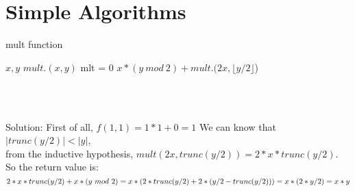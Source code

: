\documentclass{article}
\begin{document}
\section{Simple Algorithms}
\begin{algorithm}
    \caption{mult function}
    \begin{algorithmic}[1]
    \Require $x,y$
    \Ensure $mult.(x,y)$
    \State mlt = 0
    \Else 
    \State \Return $x*(y\ mod\ 2) + mult.(2x, \lfloor y/2 \rfloor$)
    \EndIf 
    \EndFunction
    \end{algorithmic}
\end{algorithm}
\\
\\Solution:
First of all, $f(1,1)=1*1+0=1$
We can know that $\vert trunc(y/2)\vert <\vert y\vert $,
\\from the inductive hypothesis, $mult(2x, trunc(y/2)) =2*x*trunc(y/2)$.
\\So the return value is:
$2*x*trunc(y/2)+x*(y\ mod\ 2)
\\=x*(2*trunc(y/2)+2*(y/2-trunc(y/2)))
\\=x*(2*y/2)
\\=x*y$
\end{document}
